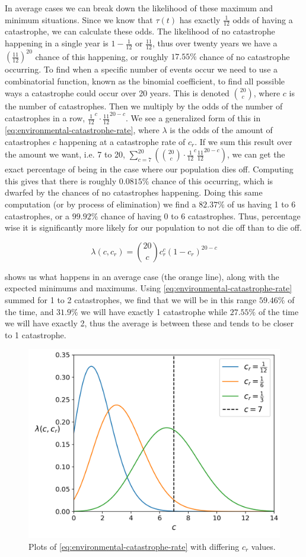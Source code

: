 \documentclass{article}
\begin{document}
In average cases we can break down the likelihood of these maximum and minimum situations. Since we know that $\tau(t)$ has exactly $\frac{1}{12}$ odds of having a catastrophe, we can calculate these odds. The likelihood of no catastrophe happening in a single year is $1 - \frac{1}{12}$ or $\frac{11}{12}$, thus over twenty years we have a $\left(\frac{11}{12}\right)^{20}$ chance of this happening, or roughly $17.55\%$ chance of no catastrophe occurring. To find when a specific number of events occur we need to use a combinatorial function, known as the binomial coefficient, to find all possible ways a catastrophe could occur over 20 years. This is denoted $\binom{20}{c}$, where $c$ is the number of catastrophes. Then we multiply by the odds of the number of catastrophes in a row, $\frac{1}{12}^c \cdot \frac{11}{12}^{20-c}$. We see a generalized form of this in \cref{eq:environmental-catastrophe-rate}, where $\lambda$ is the odds of the amount of catastrophes $c$ happening at a catastrophe rate of $c_r$. If we sum this result over the amount we want, i.e. 7 to 20, $\sum_{c=7}^{20}\left(\binom{20}{c} \cdot \frac{1}{12}^c \frac{11}{12}^{20-c}\right)$, we can get the exact percentage of being in the case where our population dies off. Computing this gives that there is roughly $0.0815\%$ chance of this occurring, which is dwarfed by the chances of no catastrophes happening. Doing this same computation (or by process of elimination) we find a $82.37\%$ of us having 1 to 6 catastrophes, or a $99.92\%$ chance of having 0 to 6 catastrophes. Thus, percentage wise it is significantly more likely for our population to not die off than to die off.

\begin{equation} \label{eq:environmental-catastrophe-rate}
    \lambda(c, c_r) = \binom{20}{c} c_r^c (1-c_r)^{20-c}
\end{equation}

 shows us what happens in an average case (the orange line), along with the expected minimums and maximums. Using \cref{eq:environmental-catastrophe-rate} summed for 1 to 2 catastrophes, we find that we will be in this range $59.46\%$ of the time, and $31.9\%$ we will have exactly 1 catastrophe while $27.55\%$ of the time we will have exactly 2, thus the average is between these and tends to be closer to 1 catastrophe.

\begin{figure}[h!]
    \centering
    \includegraphics[width=.5\linewidth]{plots/catastrophe_rate.png}
    \caption{Plots of \cref{eq:environmental-catastrophe-rate} with differing $c_r$ values.}
    \label{fig:environmental-catastrophe-rate}
\end{figure}
\end{document}
